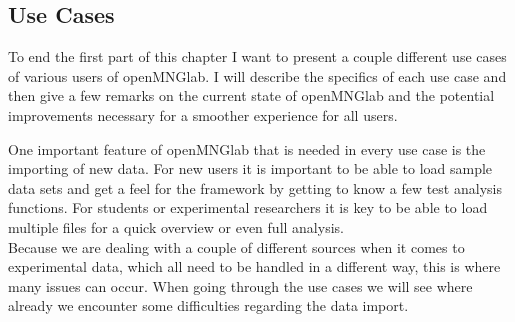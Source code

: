 \subsection{Use Cases}
To end the first part of this chapter I want to present a couple different use cases of various users of openMNGlab. I will describe the specifics of each use case and then give a few remarks on the current state of openMNGlab and the potential improvements necessary for a smoother experience for all users.

One important feature of openMNGlab that is needed in every use case is the importing of new data. For new users it is important to be able to load sample data sets and get a feel for the framework by getting to know a few test analysis functions. For students or experimental researchers it is key to be able to load multiple files for a quick overview or even full analysis.\\
Because we are dealing with a couple of different sources when it comes to experimental data, which all need to be handled in a different way, this is where many issues can occur. When going through the use cases we will see where already we encounter some difficulties regarding the data import.



